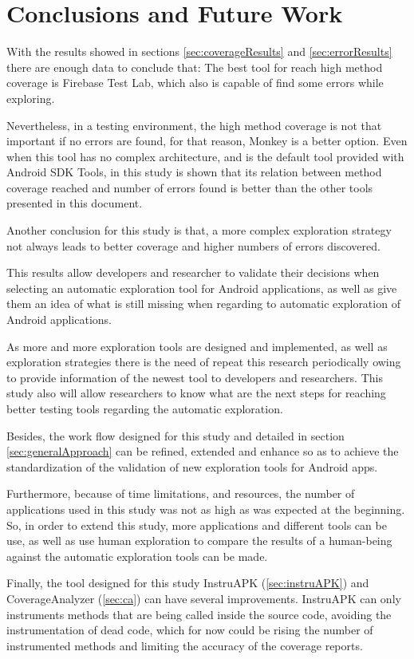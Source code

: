 
\chapter{Conclusions and Future Work} %
\label{Chapter5}

With the results showed in sections \ref{sec:coverageResults} and \ref{sec:errorResults} there are enough data to conclude that: The best tool for reach high method coverage is Firebase Test Lab, which also is capable of find some errors while exploring.

Nevertheless, in a testing environment, the high method coverage is not that important if no errors are found, for that reason, Monkey is a better option. Even when this tool has no complex architecture, and is the default tool provided with Android SDK Tools, in this study is shown that its relation between method coverage reached and number of errors found is better than the other tools presented in this document. 

Another conclusion for this study is that, a more complex exploration strategy not always leads to better coverage and higher numbers of errors discovered.

This results allow developers and researcher to validate their decisions when selecting an automatic exploration tool for Android applications, as well as give them an idea of what is still missing when regarding to automatic exploration of Android applications.

As more and more exploration tools are designed and implemented, as well as exploration strategies there is the need of repeat this research periodically owing to provide information of the newest tool to developers and researchers. This study also will allow researchers to know what are the next steps for reaching better testing tools regarding the automatic exploration. 

Besides, the work flow designed for this study and detailed in section \ref{sec:generalApproach} can be refined, extended and enhance so as to achieve the standardization of the validation of new exploration tools for Android apps. 

Furthermore, because of time limitations, and resources, the number of applications used in this study was not as high as was expected at the beginning. So, in order to extend this study, more applications and different tools can be use, as well as use human exploration to compare the results of a human-being against the automatic exploration tools can be made.

Finally, the tool designed for this study InstruAPK (\ref{sec:instruAPK}) and CoverageAnalyzer (\ref{sec:ca}) can have several improvements. InstruAPK can only instruments methods that are being called inside the source code, avoiding the instrumentation of dead code, which for now could be rising the number of instrumented methods and limiting the accuracy of the coverage reports.